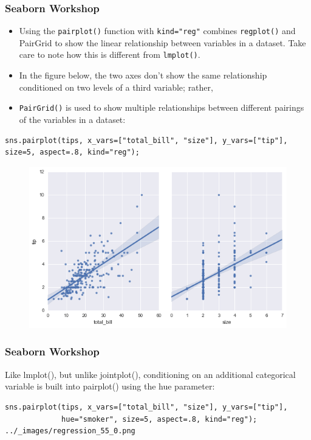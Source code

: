 \documentclass{beamer}
\begin{document}
\begin{frame}[fragile]
	\frametitle{Seaborn Workshop}
	\large
\begin{itemize}
\item Using the \texttt{pairplot()} function with \texttt{kind="reg"} combines \texttt{regplot()} and PairGrid to show the linear relationship between variables in a dataset. Take care to note how this is different from \texttt{lmplot()}. 
\item In the figure below, the two axes don’t show the same relationship conditioned on two levels of a third variable; rather, \item \texttt{PairGrid()} is used to show multiple relationships between different pairings of the variables in a dataset:
\end{itemize}

\end{frame}
\begin{frame}[fragile]
	\large
\begin{verbatim}
sns.pairplot(tips, x_vars=["total_bill", "size"], y_vars=["tip"],
size=5, aspect=.8, kind="reg");
\end{verbatim}
\begin{figure}
\centering
\includegraphics[width=0.7\linewidth]{images/regression_53_0}
\end{figure}

\end{frame}
\begin{frame}[fragile]
	\frametitle{Seaborn Workshop}
	Like lmplot(), but unlike jointplot(), conditioning on an additional categorical variable is built into pairplot() using the hue parameter:
\begin{verbatim}
sns.pairplot(tips, x_vars=["total_bill", "size"], y_vars=["tip"],
             hue="smoker", size=5, aspect=.8, kind="reg");
../_images/regression_55_0.png
\end{verbatim}
\end{frame}
\end{document}
